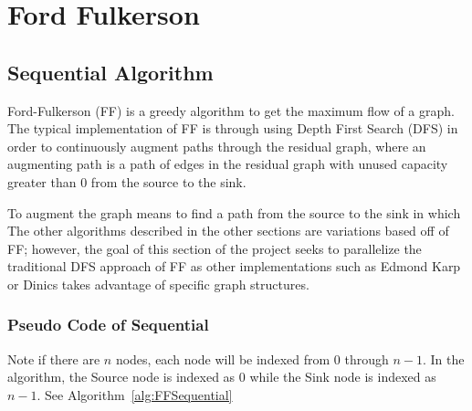 \section{Ford Fulkerson}

\subsection{Sequential Algorithm}
    Ford-Fulkerson (FF) is a greedy algorithm to get the maximum flow of a graph.  The typical implementation of FF is through using Depth First Search (DFS) in order to continuously augment paths through the residual graph, where an augmenting path is a path of edges in the residual graph with unused capacity greater than 0 from the source to the sink. \cite{FF-Fiset}
    
    To augment the graph means to find a path from the source to the sink in which  The other algorithms described in the other sections are variations based off of FF; however, the goal of this section of the project seeks to parallelize the traditional DFS approach \cite{FFvEk} of FF as other implementations such as Edmond Karp or Dinics takes advantage of specific graph structures.
    \newline
    
    \subsubsection{Pseudo Code of Sequential}
    Note if there are $n$ nodes, each node will be indexed from 0 through $n-1$. In the algorithm, the Source node is indexed as 0 while the Sink node is indexed as $n-1$. See Algorithm~\ref{alg:FFSequential}

